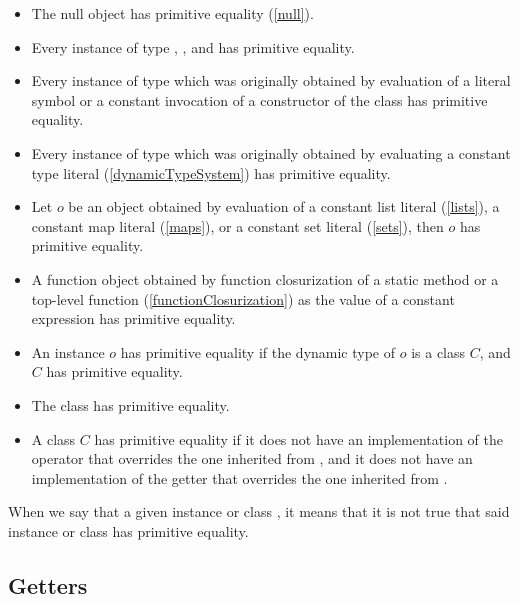 \documentclass[makeidx]{article}
\begin{document}
\begin{itemize}
\item The null object has primitive equality
  (\ref{null}).
\item Every instance of type , , and 
  has primitive equality.
\item Every instance of type 
  which was originally obtained by evaluation of a literal symbol or
  a constant invocation of a constructor of the  class
  has primitive equality.
\item
  Every instance of type 
  which was originally obtained by evaluating a constant type literal
  (\ref{dynamicTypeSystem})
  has primitive equality.
\item
  Let $o$ be an object obtained by evaluation of a constant list literal
  (\ref{lists}),
  a constant map literal
  (\ref{maps}), or
  a constant set literal
  (\ref{sets}),
  then $o$ has primitive equality.
\item
  A function object obtained by function closurization of
  a static method or a top-level function
  (\ref{functionClosurization})
  as the value of a constant expression
  has primitive equality.
\item
  An instance $o$ has primitive equality
  if the dynamic type of $o$ is a class $C$,
  and $C$ has primitive equality.
\item
  The class  has primitive equality.
\item
  A class $C$ has primitive equality
  if it does not have an implementation of the operator \lit{==}
  that overrides the one inherited from ,
  and it does not have an implementation of the getter 
  that overrides the one inherited from .
\end{itemize}

\LMHash{}%
When we say that a given instance or class
,
it means that it is not true that said instance or class
has primitive equality.


\subsection{Getters}
\end{document}
